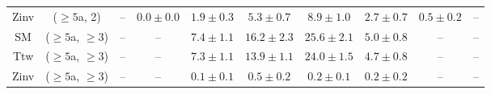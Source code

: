 \begin{table}[h!]
{\begin{tabular}{cccccccccc}
	Zinv & ($\ge5$a, 2) & -- & $0.0\pm 0.0$ & $1.9\pm 0.3$ & $5.3\pm 0.7$ & $8.9\pm 1.0$ & $2.7\pm 0.7$ & $0.5\pm 0.2$ & -- \\[0.5ex] 
	SM & ($\ge5$a, $\ge3$) & -- & -- & $7.4\pm 1.1$ & $16.2\pm 2.3$ & $25.6\pm 2.1$ & $5.0\pm 0.8$ & -- & -- \\[0.5ex] 
	Ttw & ($\ge5$a, $\ge3$) & -- & -- & $7.3\pm 1.1$ & $13.9\pm 1.1$ & $24.0\pm 1.5$ & $4.7\pm 0.8$ & -- & -- \\[0.5ex] 
	Zinv & ($\ge5$a, $\ge3$) & -- & -- & $0.1\pm 0.1$ & $0.5\pm 0.2$ & $0.2\pm 0.1$ & $0.2\pm 0.2$ & -- & -- \\[0.5ex] 
	\hline
	\hline
\end{tabular}}
\end{table}
